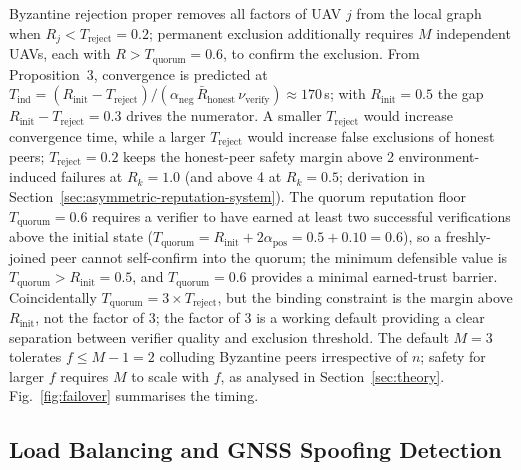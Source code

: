 \documentclass[journal,10pt,twocolumn]{IEEEtran}
\begin{document}
Byzantine rejection proper removes all factors of UAV $j$ from the local graph when $R_j < T_\text{reject} = 0.2$; permanent exclusion additionally requires $M$ independent UAVs, each with $R > T_\text{quorum} = 0.6$, to confirm the exclusion. From Proposition~3, convergence is predicted at $T_\text{ind} = (R_\text{init}-T_\text{reject})/(\alpha_\text{neg}\,\bar{R}_\text{honest}\,\nu_\text{verify}) \approx 170$\,s; with $R_\text{init}=0.5$ the gap $R_\text{init}-T_\text{reject}=0.3$ drives the numerator. A smaller $T_\text{reject}$ would increase convergence time, while a larger $T_\text{reject}$ would increase false exclusions of honest peers; $T_\text{reject}=0.2$ keeps the honest-peer safety margin above 2 environment-induced failures at $R_k=1.0$ (and above 4 at $R_k=0.5$; derivation in Section~\ref{sec:asymmetric-reputation-system}). The quorum reputation floor $T_\text{quorum}=0.6$ requires a verifier to have earned at least two successful verifications above the initial state ($T_\text{quorum} = R_\text{init} + 2\alpha_\text{pos} = 0.5 + 0.10 = 0.6$), so a freshly-joined peer cannot self-confirm into the quorum; the minimum defensible value is $T_\text{quorum} > R_\text{init} = 0.5$, and $T_\text{quorum}=0.6$ provides a minimal earned-trust barrier. Coincidentally $T_\text{quorum} = 3 \times T_\text{reject}$, but the binding constraint is the margin above $R_\text{init}$, not the factor of $3$; the factor of $3$ is a working default providing a clear separation between verifier quality and exclusion threshold. The default $M = 3$ tolerates $f \leq M-1 = 2$ colluding Byzantine peers irrespective of $n$; safety for larger $f$ requires $M$ to scale with $f$, as analysed in Section~\ref{sec:theory}. Fig.~\ref{fig:failover} summarises the timing.

\subsection{Load Balancing and GNSS Spoofing Detection}
\end{document}
